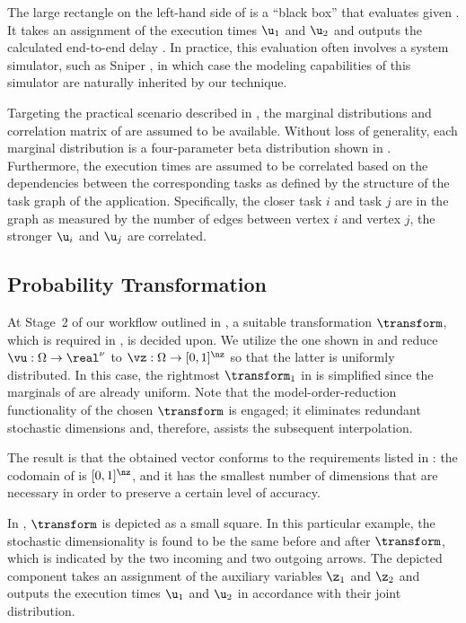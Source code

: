 The large rectangle on the left-hand side of  is a
``black box'' that evaluates \g given \vu. It takes an assignment of the
execution times $\u_1$ and $\u_2$ and outputs the calculated end-to-end delay
\g. In practice, this evaluation often involves a system simulator, such as
Sniper \cite{carlson2011}, in which case the modeling capabilities of this
simulator are naturally inherited by our technique.

Targeting the practical scenario described in , the
marginal distributions and correlation matrix of \vu are assumed to be
available. Without loss of generality, each marginal distribution is a
four-parameter beta distribution shown in . Furthermore,
the execution times are assumed to be correlated based on the dependencies
between the corresponding tasks as defined by the structure of the task graph of
the application. Specifically, the closer task $i$ and task $j$ are in the graph
as measured by the number of edges between vertex $i$ and vertex $j$, the
stronger $\u_i$ and $\u_j$ are correlated.

\subsection{Probability Transformation}

At Stage~2 of our workflow outlined in , a suitable
transformation $\transform$, which is required in ,
is decided upon. We utilize the one shown in 
and reduce $\vu: \Omega \to \real^\nu$ to $\vz: \Omega \to [0, 1]^\nz$ so that
the latter is uniformly distributed. In this case, the rightmost $\transform_1$
in  is simplified since the marginals of \vz
are already uniform. Note that the model-order-reduction functionality of the
chosen $\transform$ is engaged; it eliminates redundant stochastic dimensions
and, therefore, assists the subsequent interpolation.

The result is that the obtained vector \vz conforms to the requirements listed
in : the codomain of \vz is $[0, 1]^\nz$, and it has
the smallest number of dimensions that are necessary in order to preserve a
certain level of accuracy.

In , $\transform$ is depicted as a small square. In this
particular example, the stochastic dimensionality is found to be the same before
and after $\transform$, which is indicated by the two incoming and two outgoing
arrows. The depicted component takes an assignment of the auxiliary variables
$\z_1$ and $\z_2$ and outputs the execution times $\u_1$ and $\u_2$ in
accordance with their joint distribution.


